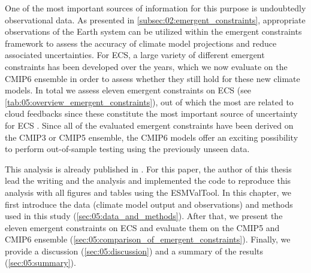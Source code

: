 One of the most important sources of information for this purpose is
undoubtedly observational data. As presented in
\cref{subsec:02:emergent_constraints}, appropriate observations of the Earth
system can be utilized within the emergent constraints framework to assess the
accuracy of climate model projections and reduce associated uncertainties. For
\ac{ECS}, a large variety of different emergent constraints has been developed
over the years, which we now evaluate on the \acs{CMIP}6 ensemble in order to
assess whether they still hold for these new climate models. In total we assess
eleven emergent constraints on \ac{ECS} (see
\cref{tab:05:overview_emergent_constraints}), out of which the most are related
to cloud feedbacks since these constitute the most important source of
uncertainty for \ac{ECS} . Since all of the evaluated emergent
constraints have been derived on the \acs{CMIP}3 or \acs{CMIP}5 ensemble, the
\acs{CMIP}6 models offer an exciting possibility to perform out-of-sample
testing using the previously unseen data.

This analysis is already published in \textcite{Schlund2020a}. For this paper,
the author of this thesis lead the writing and the analysis and implemented the
code to reproduce this analysis with all figures and tables using the
\ac{ESMValTool}. In this chapter, we first introduce the data (climate model
output and observations) and methods used in this study
(\cref{sec:05:data_and_methods}). After that, we present the eleven emergent
constraints on \acs{ECS} and evaluate them on the \acs{CMIP}5 and \acs{CMIP}6
ensemble (\cref{sec:05:comparison_of_emergent_constraints}). Finally, we
provide a discussion (\cref{sec:05:discussion}) and a summary of the results
(\cref{sec:05:summary}).

